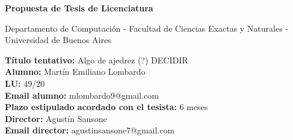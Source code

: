\begin{titlepage}
\begin{center}

\vspace*{0.5cm}

\huge\bfseries
Propuesta de Tesis de Licenciatura

\vspace*{0.5cm}

\large Departamento de Computación - Facultad de Ciencias Exactas y Naturales - Universidad de Buenos Aires

\end{center}

\vspace*{0.5cm}

\noindent
\textbf{Título tentativo:} Algo de ajedrez (?) DECIDIR \\
\textbf{Alumno:} Martín Emiliano Lombardo \\
\textbf{LU:} 49/20 \\
\textbf{Email alumno:} mlombardo9@gmail.com \\
\textbf{Plazo estipulado acordado con el tesista:} 6 meses
\\
\textbf{Director:} Agustín Sansone \\
\textbf{Email director:} agustinsansone7@gmail.com \\

\vspace*{\fill}
\end{titlepage}
